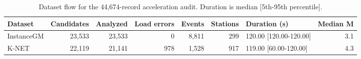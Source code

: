 \begin{table}[!htbp]
\centering
\caption{Dataset flow for the 44,674-record acceleration audit. Duration is median [5th-95th percentile].}
\label{tab:dataset}
\begin{singlespace}
\footnotesize
\setlength{\tabcolsep}{3pt}
\begin{tabular*}{\textwidth}{@{\extracolsep{\fill}}lrrrrrlr@{}}
\toprule
Dataset & Candidates & Analyzed & Load errors & Events & Stations & Duration (s) & Median M \\
\midrule
InstanceGM & 23,533 & 23,533 & 0 & 8,811 & 299 & 120.00 [120.00-120.00] & 3.1 \\
K-NET & 22,119 & 21,141 & 978 & 1,528 & 917 & 119.00 [60.00-120.00] & 4.3 \\
\bottomrule
\end{tabular*}
\end{singlespace}
\end{table}
